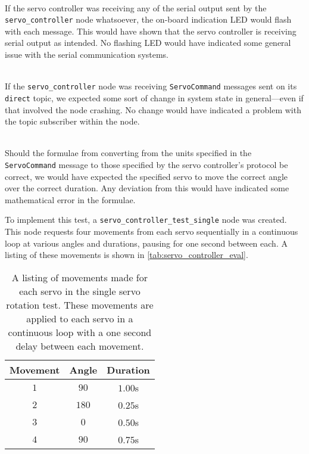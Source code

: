 \begin{description}[labelindent=\parindent]
	\item[Hardware Communication] \hfill \\
	If the servo controller was receiving any of the serial output sent by the \texttt{servo\_controller} node whatsoever, the on-board indication LED would flash with each message. This would have shown that the servo controller is receiving serial output as intended. No flashing LED would have indicated some general issue with the serial communication systems.

	\item[Topic Reception] \hfill \\
	If the \texttt{servo\_controller} node was receiving \texttt{ServoCommand} messages sent on its \texttt{direct} topic, we expected some sort of change in system state in general---even if that involved the node crashing. No change would have indicated a problem with the topic subscriber within the node.

	\item[Index, Angle \& Duration Conversion] \hfill \\
	Should the formulae from converting from the units specified in the \texttt{ServoCommand} message to those specified by the servo controller's protocol be correct, we would have expected the specified servo to move the correct angle over the correct duration. Any deviation from this would have indicated some mathematical error in the formulae.
\end{description}

To implement this test, a \texttt{servo\_controller\_test\_single} node was created. This node requests four movements from each servo sequentially in a continuous loop at various angles and durations, pausing for one second between each. A listing of these movements is shown in \autoref{tab:servo_controller_eval}.

\begin{table}[!h]
	\centering
	\begin{tabular}{ c c c }
		\toprule
		\textbf{Movement} & \textbf{Angle} & \textbf{Duration} \\
		\midrule

		$1$ &
		$90$\textdegree{} &
		$1.00$s \\

		$2$ &
		$180$\textdegree{} &
		$0.25$s \\

		$3$ &
		$0$\textdegree{} &
		$0.50$s \\

		$4$ &
		$90$\textdegree{} &
		$0.75$s \\
		\bottomrule
	\end{tabular}
	\caption{A listing of movements made for each servo in the single servo rotation test. These movements are applied to each servo in a continuous loop with a one second delay between each movement.}
	\label{tab:servo_controller_eval}
\end{table}

